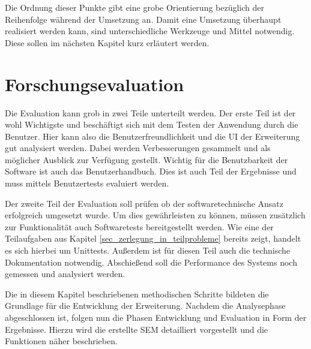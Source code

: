 Die Ordnung dieser Punkte gibt eine grobe Orientierung bezüglich der Reihenfolge
während der Umsetzung an. Damit eine Umsetzung überhaupt realisiert werden kann,
sind unterschiedliche Werkzeuge und Mittel notwendig. Diese sollen im nächsten Kapitel
kurz erläutert werden.

\section{Forschungsevaluation}
Die Evaluation kann grob in zwei Teile unterteilt werden. Der erste Teil ist der
wohl Wichtigste und beschäftigt sich mit dem Testen der Anwendung durch die
Benutzer. Hier kann also die Benutzerfreundlichkeit und die \ac{UI} der
Erweiterung gut analysiert werden. Dabei werden Verbesserungen gesammelt und als
möglicher Ausblick zur Verfügung gestellt. Wichtig für die Benutzbarkeit der
Software ist auch das Benutzerhandbuch. Dies ist auch Teil der Ergebnisse und muss
mittels Benutzertests evaluiert werden.

Der zweite Teil der Evaluation soll prüfen ob der softwaretechnische Ansatz erfolgreich
umgesetzt wurde. Um dies gewährleisten zu können, müssen zusätzlich zur Funktionalität
auch Softwaretests bereitgestellt werden. Wie eine der Teilaufgaben aus Kapitel
\ref{sec_zerlegung_in_teilprobleme} bereits zeigt, handelt es sich hierbei um Unittests.
Außerdem ist für diesen Teil auch die technische Dokumentation notwendig. Abschießend
soll die Performance des Systems noch gemessen und analysiert werden.

Die in diesem Kapitel beschriebenen methodischen Schritte bildeten die Grundlage
für die Entwicklung der Erweiterung. Nachdem die Analysephase abgeschlossen ist,
folgen nun die Phasen Entwicklung und Evaluation in Form der Ergebnisse. Hierzu
wird die erstellte \ac{SEM} detailliert vorgestellt und die Funktionen näher beschrieben.
